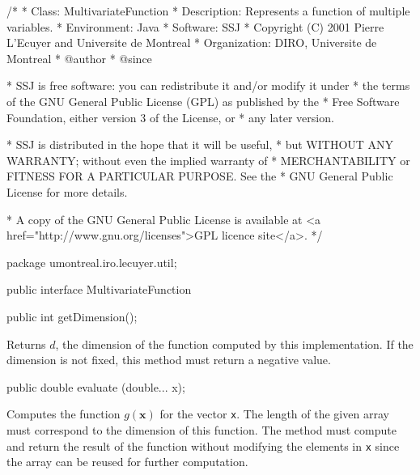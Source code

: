 \begin{code}\begin{hide}
/*
 * Class:        MultivariateFunction
 * Description:  Represents a function of multiple variables.
 * Environment:  Java
 * Software:     SSJ 
 * Copyright (C) 2001  Pierre L'Ecuyer and Universite de Montreal
 * Organization: DIRO, Universite de Montreal
 * @author       
 * @since

 * SSJ is free software: you can redistribute it and/or modify it under
 * the terms of the GNU General Public License (GPL) as published by the
 * Free Software Foundation, either version 3 of the License, or
 * any later version.

 * SSJ is distributed in the hope that it will be useful,
 * but WITHOUT ANY WARRANTY; without even the implied warranty of
 * MERCHANTABILITY or FITNESS FOR A PARTICULAR PURPOSE.  See the
 * GNU General Public License for more details.

 * A copy of the GNU General Public License is available at
   <a href="http://www.gnu.org/licenses">GPL licence site</a>.
 */
\end{hide}
package umontreal.iro.lecuyer.util;


public interface MultivariateFunction\begin{hide} {\end{hide}

   public int getDimension();
\end{code}
\begin{tabb} Returns $d$, the dimension of the function computed
   by this implementation.  If the dimension is not fixed,
   this method must return a negative value.
\end{tabb}
\begin{htmlonly}
\end{htmlonly}
\begin{code}

   public double evaluate (double... x);
\end{code}
\begin{tabb}   Computes the function $g(\mathbf{x})$
 for the vector \texttt{x}.  The length of the
 given array must correspond to the dimension of
 this function.  The method must compute and return the result
 of the function without modifying the elements
 in \texttt{x} since the array can be reused for
 further computation.
\end{tabb}
\begin{htmlonly}
\end{htmlonly}

